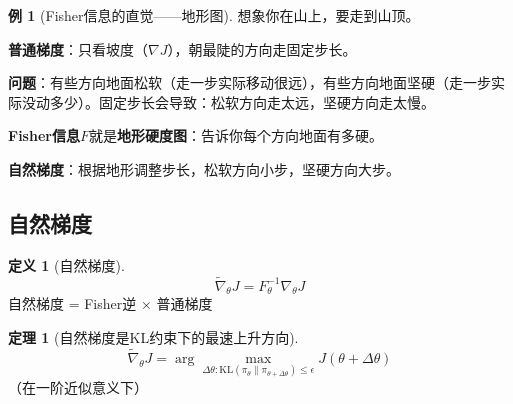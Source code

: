 \documentclass[11pt,a4paper]{article}
\theoremstyle{definition}
\newtheorem{definition}{定义}[section]
\newtheorem{example}{例}[section]
\newtheorem{theorem}{定理}[section]
\begin{document}
\begin{example}[Fisher信息的直觉——地形图]
想象你在山上，要走到山顶。

\textbf{普通梯度}：只看坡度（$\nabla J$），朝最陡的方向走固定步长。

\textbf{问题}：有些方向地面松软（走一步实际移动很远），有些方向地面坚硬（走一步实际没动多少）。固定步长会导致：松软方向走太远，坚硬方向走太慢。

\textbf{Fisher信息}$F$就是\textbf{地形硬度图}：告诉你每个方向地面有多硬。

\textbf{自然梯度}：根据地形调整步长，松软方向小步，坚硬方向大步。
\end{example}

\subsection{自然梯度}

\begin{definition}[自然梯度]
\[
\tilde{\nabla}_\theta J = F_\theta^{-1} \nabla_\theta J
\]
自然梯度 = Fisher逆 × 普通梯度
\end{definition}

\begin{theorem}[自然梯度是KL约束下的最速上升方向]
\[
\tilde{\nabla}_\theta J = \arg\max_{\Delta\theta: \text{KL}(\pi_\theta \| \pi_{\theta+\Delta\theta}) \leq \epsilon} J(\theta + \Delta\theta)
\]
（在一阶近似意义下）
\end{theorem}
\end{document}
